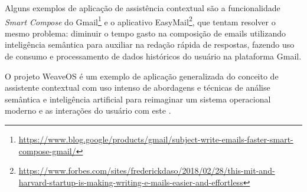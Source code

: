 Alguns exemplos de aplicação de assistência contextual são a funcionalidade \textit{Smart Compose} do Gmail\footnote{\url{https://www.blog.google/products/gmail/subject-write-emails-faster-smart-compose-gmail/}} e o aplicativo EasyMail\footnote{\url{https://www.forbes.com/sites/frederickdaso/2018/02/28/this-mit-and-harvard-startup-is-making-writing-e-mails-easier-and-effortless}}, que tentam resolver o mesmo problema: diminuir o tempo gasto na composição de emails utilizando inteligência semântica para auxiliar na redação rápida de respostas, fazendo uso de consumo e processamento de dados históricos do usuário na plataforma Gmail.

O projeto WeaveOS é um exemplo de aplicação generalizada do conceito de assistente contextual com uso intenso de abordagens e técnicas de análise semântica e inteligência artificial para reimaginar um sistema operacional moderno e as interações do usuário com este \cite{bura2016ai}.